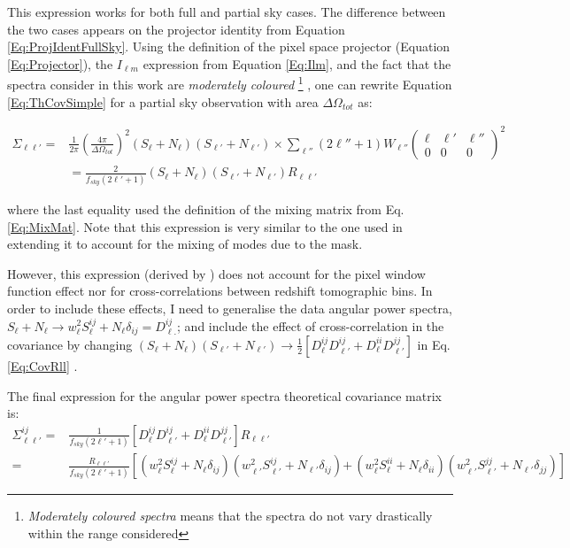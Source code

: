 \qquad This expression works for both full and partial sky cases. The difference between the two cases appears on the projector identity from Equation \eqref{Eq:ProjIdentFullSky}. Using the definition of the pixel space projector (Equation \ref{Eq:Projector}), the $I_{\ell m}$ expression from Equation \eqref{Eq:Ilm}, and the fact that the spectra consider in this work are \textit{moderately coloured} \footnote{\textit{Moderately coloured spectra} means that the spectra do not vary drastically within the range considered} \citep{2008DahlenSimons}, one can rewrite Equation \eqref{Eq:ThCovSimple} for a partial sky observation with area $\Delta\Omega_{tot}$ as:

\begin{align}
\Sigma_{\ell \ell'}   = & \frac{1}{2\pi}\left(\frac{4\pi}{\Delta\Omega_{tot}}\right)^2 (S_{\ell} + N_{\ell})(S_{\ell '}+ N_{\ell '}) \times \sum_{\ell ''}(2\ell ''+1)W_{\ell''}\begin{pmatrix} \ell & \ell' & \ell'' \\ 0 & 0 & 0 \end{pmatrix}^2 \\ 
& = \frac{2}{f_{sky}(2\ell' + 1)}(S_{\ell} + N_{\ell})(S_{\ell '}+ N_{\ell '})R_{\ell\ell'}
\label{Eq:CovRll}
\end{align}

where the last equality used the definition of the mixing matrix from Eq. \eqref{Eq:MixMat}. Note that this expression is very similar to the one used in \cite{Blake2007,Padm2007,Thomas2011} extending it to account for the mixing of modes due to the mask. 

\qquad However, this expression (derived by \citealt{2008DahlenSimons}) does not account for the pixel window function effect nor for cross-correlations between redshift tomographic bins. In order to include these effects, I need to generalise the data angular power spectra, $S_{\ell} + N_{\ell} \rightarrow w_{\ell}^2S_{\ell}^{ij} + N_{\ell}\delta_{ij} = D^{ij}_{\ell.}$; and include the effect of cross-correlation in the covariance by changing $(S_{\ell} + N_{\ell})(S_{\ell'} + N_{\ell'})\rightarrow \frac{1}{2}[D^{ij}_{\ell}D^{ij}_{\ell'} + D^{ii}_{\ell}D^{jj}_{\ell'}]$ in Eq. \eqref{Eq:CovRll} \citep{Rassat2007}. 

\qquad The final expression for the angular power spectra theoretical covariance matrix is:
\begin{align}
\Sigma_{\ell \ell'}^{ij}  = & \frac{1}{f_{sky}(2\ell'+1)}[D^{ij}_{\ell}D^{ij}_{\ell'} + D^{ii}_{\ell}D^{jj}_{\ell'}] R_{\ell \ell'} \\
= & \frac{R_{\ell\ell'}}{f_{sky}(2\ell'+1)} \left[(w_{\ell}^2S_{\ell}^{ij} + N_{\ell}\delta_{ij})(w_{\ell'}^2S_{\ell'}^{ij} + N_{\ell'}\delta_{ij}) \right. \left. + \, (w_{\ell}^2S_{\ell}^{ii} + N_{\ell}\delta_{ii})(w_{\ell'}^2S_{\ell'}^{jj} + N_{\ell'}\delta_{jj}) \right]
\label{Eq:TheoVariance}
\end{align}


